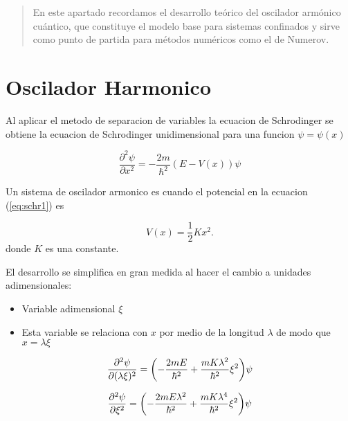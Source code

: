 \documentclass[11pt]{article}
\author{Rafael Corella, Carlos Felix, Bryan Campa}
\begin{document}
\begin{abstract}
En este apartado recordamos el desarrollo teórico del oscilador armónico
cuántico, que constituye el modelo base para sistemas confinados y sirve
como punto de partida para métodos numéricos como el de Numerov.
\end{abstract}

\section{Oscilador Harmonico}

Al aplicar el metodo de separacion de variables la ecuacion de Schrodinger se obtiene la ecuacion de Schrodinger unidimensional para una funcion \(\psi = \psi(x)\)

\begin{equation}
\label{eq:schr1}
\frac{\partial^{2}\psi}{\partial x^2} = - \frac{2m}{\hbar^2}(E - V(x))\psi
\end{equation}

Un sistema de oscilador armonico es cuando el potencial en la ecuacion (\ref{eq:schr1}) es

\[ V(x) = \frac{1}{2}K x^2. \]
donde \(K\) es una constante.

El desarrollo se simplifica en gran medida al hacer el cambio a unidades adimensionales:

\begin{itemize}
\item Variable adimensional \(\xi\)
\item Esta variable se relaciona con \(x\) por medio de la longitud \(\lambda\) de modo que \(x = \lambda \xi\)
\end{itemize}

\[ \pdv[2]{\psi}{(\lambda \xi)} = \qty( - \frac{2m E }{\hbar^2} + \frac{mK \lambda^2}{\hbar^2} \xi^2  )\psi \]

\[ \pdv[2]{\psi}{\xi} = \qty( - \frac{2m E \lambda^{2}}{\hbar^2} + \frac{mK \lambda^4}{\hbar^2} \xi^2  )\psi \]
\end{document}
